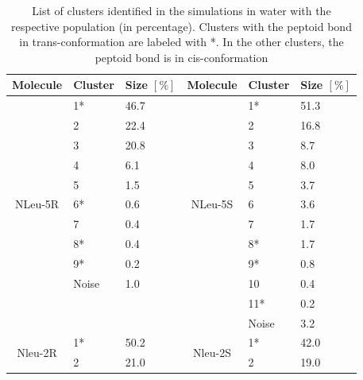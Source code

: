 \begin{table}[]
\center
\caption{ List  of  clusters  identified  in  the  simulations  in  water  with  the  respective 
population  (in  percentage).  Clusters  with  the  peptoid  bond  in  trans-conformation  are 
labeled with *. In the other clusters, the peptoid bond is in cis-conformation}
\label{tab: SIClusterTransWater}
\begin{tabular}{c|ll||c|ll}
Molecule                  & Cluster & Size $[\%]$ & Molecule                  & Cluster & Size $[\%]$ \\
\hline
\multirow{11}{*}{NLeu-5R} & 1*      & 46.7        & \multirow{11}{*}{NLeu-5S} & 1*      & 51.3        \\
                          & 2       & 22.4       &                            & 2       & 16.8        \\
                          & 3       & 20.8        &                           & 3       & 8.7         \\
                          & 4       & 6.1        &                            & 4       & 8.0         \\
                          & 5       & 1.5        &                            & 5       & 3.7         \\
                          & 6*      & 0.6         &                           & 6       & 3.6         \\
                          & 7       & 0.4         &                           & 7       & 1.7         \\
                          & 8*      & 0.4         &                           & 8*      & 1.7         \\
                          & 9*      & 0.2         &                           & 9*      & 0.8         \\
                          & Noise   & 1.0         &                           & 10      & 0.4         \\
                          &         &             &                           & 11*     & 0.2         \\
                          &         &             &                           & Noise   & 3.2        \\
\hline
\multirow{6}{*}{Nleu-2R}  & 1*      & 50.2        & \multirow{13}{*}{Nleu-2S} & 1*      & 42.0        \\
                          & 2       & 21.0        &                           & 2       & 19.0        \\

\end{tabular}
\end{table}
